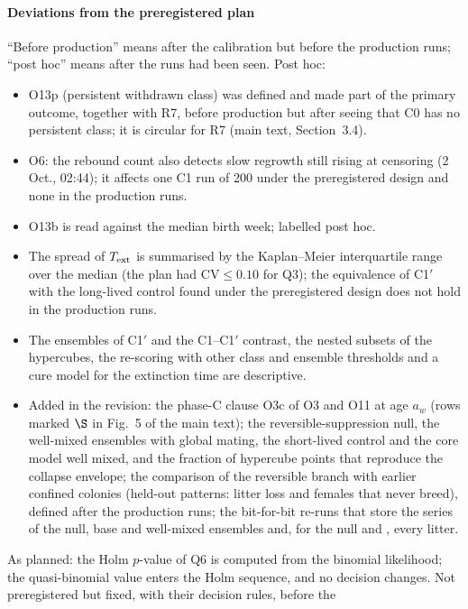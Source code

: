 \documentclass[preprint,12pt,authoryear]{elsarticle}
\begin{document}
\paragraph{Deviations from the preregistered plan}
\label{tab:deviations}
``Before production'' means after the calibration but before the production runs; ``post hoc'' means after the runs
had been seen. Post hoc:
\begin{itemize}
\item O13p (persistent withdrawn class) was defined and made part of the primary outcome, together with R7, before
  production but after seeing that \textsf{C0} has no persistent class; it is circular for R7 (main text,
  Section~3.4).
\item O6: the rebound count also detects slow regrowth still rising at censoring (2 Oct., 02:44); it affects one
  \textsf{C1} run of 200 under the preregistered design and none in the production runs.
\item O13b is read against the median birth week; labelled post hoc.
\item The spread of $T_{\rm ext}$ is summarised by the Kaplan--Meier \citep{KaplanMeier1958} interquartile range over the median (the plan had
  $\mathrm{CV}\le0.10$ for Q3); the equivalence of \textsf{C1}$'$ with the long-lived control found under the
  preregistered design does not hold in the production runs.
\item The ensembles of \textsf{C1}$'$ and the \textsf{C1}--\textsf{C1}$'$ contrast, the nested subsets of the
  hypercubes, the re-scoring with other class and ensemble thresholds and a cure model for the extinction time are
  descriptive.
\item Added in the revision: the phase-C clause O3c of O3 and O11 at age $a_w$ (rows marked $\S$ in Fig.~5 of the main
  text); the reversible-suppression null, the well-mixed ensembles with global mating, the short-lived control and the
  core model well mixed, and the fraction of hypercube points that reproduce the collapse envelope; the comparison of
  the reversible branch with earlier confined colonies (held-out patterns: litter loss and females that never breed),
  defined after the production runs; the bit-for-bit re-runs that store the series of the null, base and well-mixed
  ensembles and, for the null and \Cone, every litter.
\end{itemize}
As planned: the Holm $p$-value of Q6 is computed from the binomial likelihood; the quasi-binomial value enters the
Holm sequence, and no decision changes. Not preregistered but fixed, with their decision rules, before the
\end{document}
